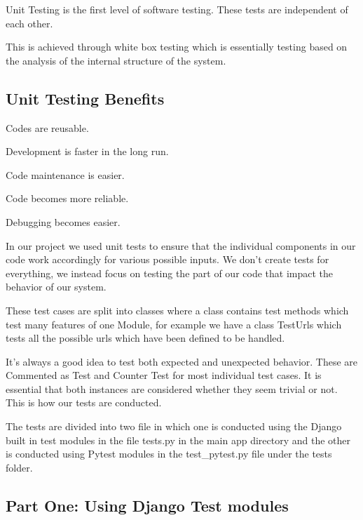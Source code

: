 \documentclass[10pt]{article}
\begin{document}
Unit Testing is the first level of software testing. These tests are independent of each other.

This is achieved through white box testing which is essentially testing based on the analysis of the internal structure of the system.

\subsection{Unit Testing Benefits}

\begin{description}[font=$\bullet$~\normalfont\scshape\color{red!50!black}]

\item [] Codes are reusable.
\item [] Development is faster in the long run.
\item [] Code maintenance is easier.
\item [] Code becomes more reliable.
\item [] Debugging becomes easier.

\end{description}

In our project we used unit tests to ensure that the individual components in our code work accordingly for various possible inputs. We don’t create tests for everything, we instead focus on testing the part of our code that impact the behavior of our system.

These test cases are split into classes where a class contains test methods which test many features of one Module, for example we have a class TestUrls which tests all the possible urls which have been defined to be handled.

It’s always a good idea to test both expected and unexpected behavior. These are Commented as Test and Counter Test for most individual test cases. It is essential that both instances are considered whether they seem trivial or not. This is how our tests are conducted.

The tests are divided into two file in which one is conducted using the Django built in test modules in the file tests.py  in the main app directory and the other is conducted using Pytest modules in the test\_pytest.py file under the tests folder.

\subsection{Part One:  Using Django Test modules}
\end{document}
